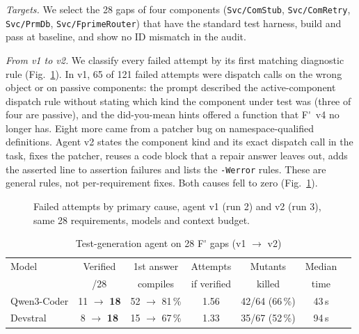 \documentclass[conference]{IEEEtran}
\newcommand{\Fp}{F\'{}}  %
\newcommand{\tool}[1]{\texttt{#1}}
\begin{document}
\emph{Targets.} We select the 28 gaps of four components (\tool{Svc/ComStub}, \tool{Svc/ComRetry},
\tool{Svc/PrmDb}, \tool{Svc/FprimeRouter}) that have the standard test harness, build and pass at baseline, and
show no ID mismatch in the audit.

\emph{From v1 to v2.} We classify every failed attempt by its first matching diagnostic rule (Fig.~\ref{fig:causes}).
In v1, 65 of 121 failed attempts were dispatch calls on the wrong object or on passive components: the prompt
described the active-component dispatch rule without stating which kind the component under test was (three of
four are passive), and the did-you-mean hints offered a function that \Fp{}~v4 no longer has. Eight more came from
a patcher bug on namespace-qualified definitions. Agent v2 states the component kind and its exact dispatch call
in the task, fixes the patcher, reuses a code block that a repair answer leaves out, adds the asserted line to
assertion failures and lists the \tool{-Werror} rules. These are general rules, not per-requirement fixes. Both
causes fell to zero (Fig.~\ref{fig:causes}).

\begin{figure}[t]
\centering

\caption{Failed attempts by primary cause, agent v1 (run 2) and v2 (run 3), same 28 requirements, models and
context budget.}
\label{fig:causes}
\end{figure}

\begin{table}[t]
\caption{Test-generation agent on 28 \Fp{} gaps (v1 $\rightarrow$ v2)}
\label{tab:agent}
\centering
\footnotesize
\setlength{\tabcolsep}{2pt}
\begin{tabular}{@{}lcccccc@{}}
\toprule
Model & Verified & 1st answer & Attempts & Mutants & Median \\
 & /28 & compiles & if verified & killed & time \\
\midrule
Qwen3-Coder & 11 $\rightarrow$ \textbf{18} & 52 $\rightarrow$ 81\,\% & 1.56 & 42/64 (66\,\%) & 43\,s \\
Devstral & 8 $\rightarrow$ \textbf{18} & 15 $\rightarrow$ 67\,\% & 1.33 & 35/67 (52\,\%) & 94\,s \\
\bottomrule
\end{tabular}
\end{table}
\end{document}
